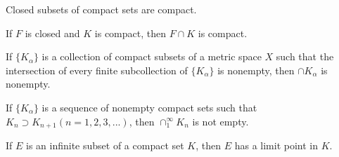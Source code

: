 \begin{thm}\label{thm:2.35 compact-close}
    Closed subsets of compact sets are compact.
\end{thm}



\begin{myCorollary}
    If $F$ is closed and $K$ is compact, then $F \cap K$ is compact.
\end{myCorollary}



\begin{thm}
    \label{thm:2.36}
    If $\{K_\alpha\}$ is a collection of compact subsets of a metric space $X$ such that the intersection of every finite subcollection of $\{K_\alpha\}$ is nonempty, then $\cap K_\alpha$ is nonempty.    
\end{thm}


\begin{myCorollary}
    If $\{K_\alpha\}$ is a sequence of nonempty compact sets such that $K_n \supset K_{n+1} (n=1,2,3,...)$, then $\cap_1^\infty K_n$ is not empty.
\end{myCorollary}

\begin{thm}
    \label{thm:2.37}
    If $E$ is an infinite subset of a compact set $K$, then $E$ has a limit point in $K$.
\end{thm}


